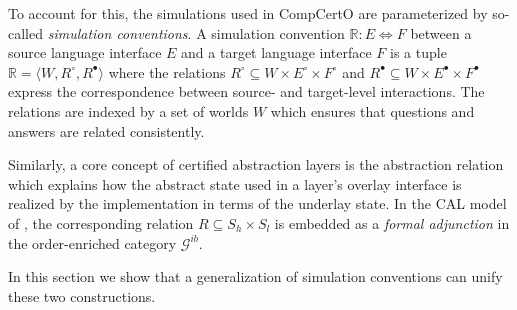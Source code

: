 \documentclass[sigplan,10pt,review,anonymous]{acmart}
\newcommand{\que}{{\circ}}
\newcommand{\ans}{{\bullet}}
\begin{document}
To account for this,
the simulations used in CompCertO
are parameterized by so-called \emph{simulation conventions}.
A simulation convention $\mathbb{R} : E \Leftrightarrow F$
between a source language interface $E$
and a target language interface $F$
is a tuple $\mathbb{R} = \langle W, R^\que, R^\ans \rangle$
where the relations $R^\que \subseteq W \times E^\que \times F^\que$
and $R^\ans \subseteq W \times E^\ans \times F^\ans$
express the correspondence between
source- and target-level interactions.
The relations are indexed by a set of worlds $W$
which ensures that questions and answers are related consistently.

Similarly,
a core concept of certified abstraction layers
is the abstraction relation
which explains how the abstract state
used in a layer's overlay interface
is realized by the implementation
in terms of the underlay state.
In the CAL model of \citep{lics20},
the corresponding relation $R \subseteq S_h \times S_l$
is embedded as a \emph{formal adjunction}
in the order-enriched category $\mathcal{G}^{ib}$.

In this section we show that a generalization of
simulation conventions can unify these two constructions.
\end{document}

